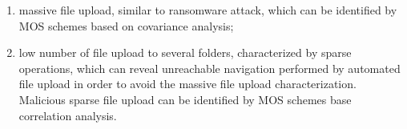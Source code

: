\documentclass[twocolumn]{svjour3}          	%
\begin{document}
\begin{enumerate}
	\item massive file upload, similar to ransomware attack, which can be identified by MOS schemes based on covariance analysis; 
	\item low number of file upload to several folders, characterized by sparse operations, which can reveal unreachable navigation performed by automated file upload in order to avoid the massive file upload characterization. Malicious sparse file upload can be identified by MOS schemes base correlation analysis.
\end{enumerate}

%
\end{document}
